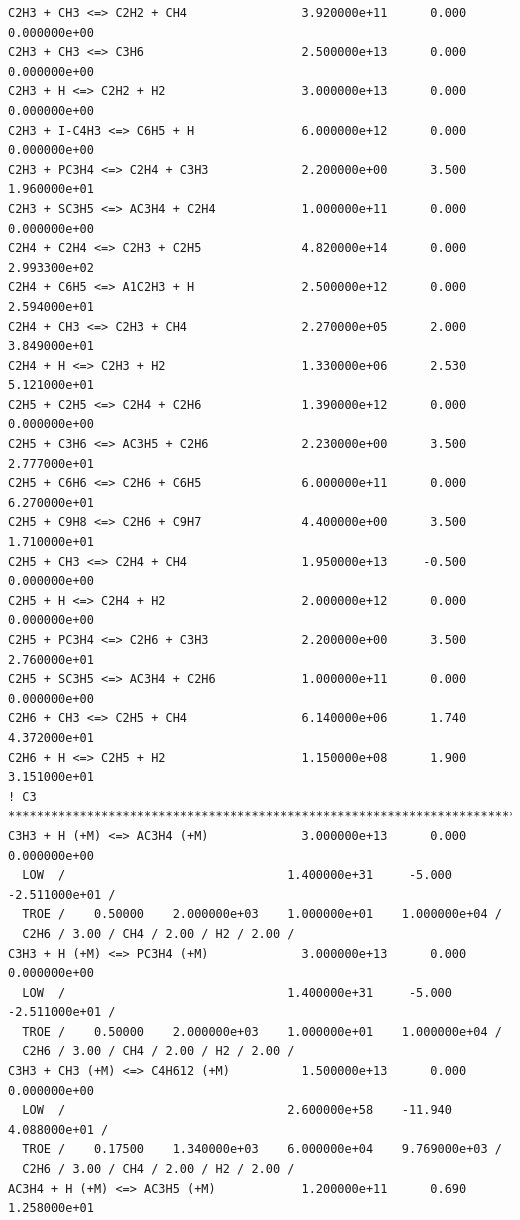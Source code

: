 \begin{verbatim}
C2H3 + CH3 <=> C2H2 + CH4                3.920000e+11      0.000    0.000000e+00
C2H3 + CH3 <=> C3H6                      2.500000e+13      0.000    0.000000e+00
C2H3 + H <=> C2H2 + H2                   3.000000e+13      0.000    0.000000e+00
C2H3 + I-C4H3 <=> C6H5 + H               6.000000e+12      0.000    0.000000e+00
C2H3 + PC3H4 <=> C2H4 + C3H3             2.200000e+00      3.500    1.960000e+01
C2H3 + SC3H5 <=> AC3H4 + C2H4            1.000000e+11      0.000    0.000000e+00
C2H4 + C2H4 <=> C2H3 + C2H5              4.820000e+14      0.000    2.993300e+02
C2H4 + C6H5 <=> A1C2H3 + H               2.500000e+12      0.000    2.594000e+01
C2H4 + CH3 <=> C2H3 + CH4                2.270000e+05      2.000    3.849000e+01
C2H4 + H <=> C2H3 + H2                   1.330000e+06      2.530    5.121000e+01
C2H5 + C2H5 <=> C2H4 + C2H6              1.390000e+12      0.000    0.000000e+00
C2H5 + C3H6 <=> AC3H5 + C2H6             2.230000e+00      3.500    2.777000e+01
C2H5 + C6H6 <=> C2H6 + C6H5              6.000000e+11      0.000    6.270000e+01
C2H5 + C9H8 <=> C2H6 + C9H7              4.400000e+00      3.500    1.710000e+01
C2H5 + CH3 <=> C2H4 + CH4                1.950000e+13     -0.500    0.000000e+00
C2H5 + H <=> C2H4 + H2                   2.000000e+12      0.000    0.000000e+00
C2H5 + PC3H4 <=> C2H6 + C3H3             2.200000e+00      3.500    2.760000e+01
C2H5 + SC3H5 <=> AC3H4 + C2H6            1.000000e+11      0.000    0.000000e+00
C2H6 + CH3 <=> C2H5 + CH4                6.140000e+06      1.740    4.372000e+01
C2H6 + H <=> C2H5 + H2                   1.150000e+08      1.900    3.151000e+01
! C3 ***************************************************************************
C3H3 + H (+M) <=> AC3H4 (+M)             3.000000e+13      0.000    0.000000e+00
  LOW  /                               1.400000e+31     -5.000   -2.511000e+01 /
  TROE /    0.50000    2.000000e+03    1.000000e+01    1.000000e+04 /
  C2H6 / 3.00 / CH4 / 2.00 / H2 / 2.00 / 
C3H3 + H (+M) <=> PC3H4 (+M)             3.000000e+13      0.000    0.000000e+00
  LOW  /                               1.400000e+31     -5.000   -2.511000e+01 /
  TROE /    0.50000    2.000000e+03    1.000000e+01    1.000000e+04 /
  C2H6 / 3.00 / CH4 / 2.00 / H2 / 2.00 / 
C3H3 + CH3 (+M) <=> C4H612 (+M)          1.500000e+13      0.000    0.000000e+00
  LOW  /                               2.600000e+58    -11.940    4.088000e+01 /
  TROE /    0.17500    1.340000e+03    6.000000e+04    9.769000e+03 /
  C2H6 / 3.00 / CH4 / 2.00 / H2 / 2.00 / 
AC3H4 + H (+M) <=> AC3H5 (+M)            1.200000e+11      0.690    1.258000e+01

\end{verbatim}
